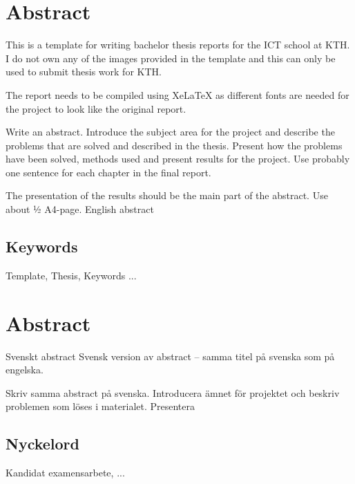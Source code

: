 \newpage
\section*{Abstract}

This is a template for writing bachelor thesis reports for the ICT school at KTH. I do not own any of the images provided in the template and this can only be used to submit thesis work for KTH.

The report needs to be compiled using XeLaTeX as different fonts are needed for the project to look like the original report.

\vspace{2cm}
Write an abstract. Introduce the subject area for the project and describe the problems that are solved and described in the thesis. Present how the problems have been solved, methods used and present results for the project. Use probably one sentence for each chapter in the final report.

The presentation of the results should be the main part of the abstract. Use about ½ A4-page.
English abstract




\subsection*{Keywords}
Template, Thesis, Keywords ...






\newpage
\section*{Abstract}
Svenskt abstract
Svensk version av abstract – samma titel på svenska som på engelska.

Skriv samma abstract på svenska. Introducera ämnet för projektet och beskriv problemen som löses i materialet. Presentera 

\subsection*{Nyckelord}
Kandidat examensarbete, ...


